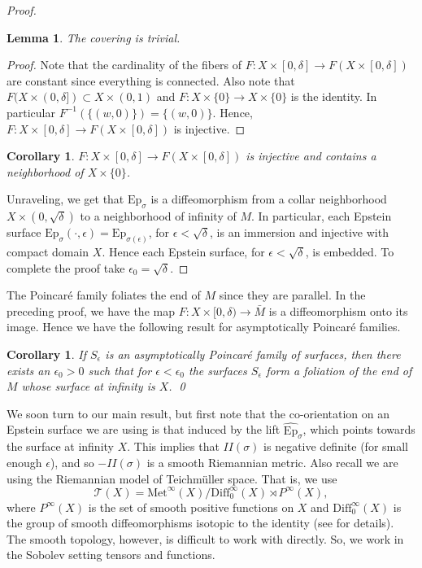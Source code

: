 \documentclass{amsart}
\newtheorem*{lem*}{Lemma}
\newtheorem{cor}[thm]{Corollary}
\newtheorem*{cor*}{Corollary}
\newcommand{\two}{I\!\!I}
\begin{document}
\begin{proof}
\begin{lem*}
The covering is trivial. 
\end{lem*}

\begin{proof}
Note that the cardinality of the fibers of $F: X \times [0,\delta] \to F(X \times [0,\delta])$ are constant since everything is connected. 
Also note that $F( X \times (0,\delta]) \subset X \times (0,1)$ and $F: X \times \{0\} \to X \times \{0\}$ is the identity. In particular $F^{-1}(\{(w,0)\}) = \{(w,0)\}$. 
Hence, $F: X \times [0,\delta] \to F(X \times [0,\delta])$ is injective. 
\end{proof}

\begin{cor*}
$F: X \times [0,\delta] \to F(X \times [0,\delta])$ is injective and contains a neighborhood of $X \times \{0\}$.
\end{cor*}



Unraveling, we get that $\mathrm{Ep}_{\sigma}$ is a diffeomorphism from a collar neighborhood $X \times (0,\sqrt{\delta})$ to a neighborhood of infinity of $M$.
In particular, each Epstein surface $\mathrm{Ep}_\sigma(\cdot, \epsilon) = \mathrm{Ep}_{\sigma(\epsilon)}$, for $\epsilon < \sqrt{\delta}$, is an immersion and injective with compact domain $X$. 
Hence each Epstein surface, for $\epsilon < \sqrt{\delta}$, is embedded.
To complete the proof take $\epsilon_0 = \sqrt{\delta}$.

\end{proof}


The Poincar\'e family foliates the end of $M$ since they are parallel. 
In the preceding proof, we have the map $F: X \times [0,\delta) \to \bar{M}$ is a diffeomorphism onto its image. 
Hence we have the following result for asymptotically Poincar\'e families.

\begin{cor}
\label{foliation}
If $S_\epsilon$ is an asymptotically Poincar\'e family of surfaces, then there exists an $\epsilon_0 > 0$ such that for $\epsilon < \epsilon_0$ the surfaces $S_\epsilon$ form a foliation of the end of $M$ whose surface at infinity is $X$.
\qed
\end{cor}



We soon turn to our main result, but first note that the co-orientation on an Epstein surface we are using is that induced by the lift $\widehat{\mathrm{Ep}}_\sigma$, which points towards the surface at infinity $X$.
This implies that $\two(\sigma)$ is negative definite (for small enough $\epsilon$), and so $-\two(\sigma)$ is a smooth Riemannian metric. 
Also recall we are using the Riemannian model of Teichm\"uller space. 
That is, we use 
\[
\mathcal{T}(X) = \mathrm{Met}^\infty(X)/  \mathrm{Diff}_0^\infty(X) \rtimes P^\infty(X),
\]
where $P^\infty(X)$ is the set of smooth positive functions on $X$ and $\mathrm{Diff}_0^\infty(X)$ is the group of smooth diffeomorphisms isotopic to the identity (see \cite{tromba1992} for details). 
The smooth topology, however, is difficult to work with directly. 
So, we work in the Sobolev setting tensors and functions.
\end{document}

